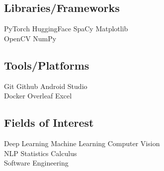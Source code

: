 \documentclass[]{plushcv}
\begin{document}
\begin{minipage}[t]{0.25\textwidth}
\subsection{Libraries/Frameworks}
\sectionsep
PyTorch \textbullet{} HuggingFace \textbullet{} SpaCy \textbullet{} Matplotlib \\ OpenCV
\textbullet{} NumPy \\ 
\sectionsep
\sectionsep

\subsection{Tools/Platforms}
\sectionsep
Git \textbullet{} Github \textbullet{} Android Studio \\ Docker \textbullet{} Overleaf \textbullet{} Excel \\
\sectionsep
\sectionsep

\subsection{Fields of Interest}
\sectionsep
Deep Learning \textbullet{} Machine Learning \textbullet{} Computer Vision \\ NLP \textbullet{} Statistics \textbullet{} Calculus \\ Software Engineering
\sectionsep
\sectionsep










\end{minipage}
\end{document}
